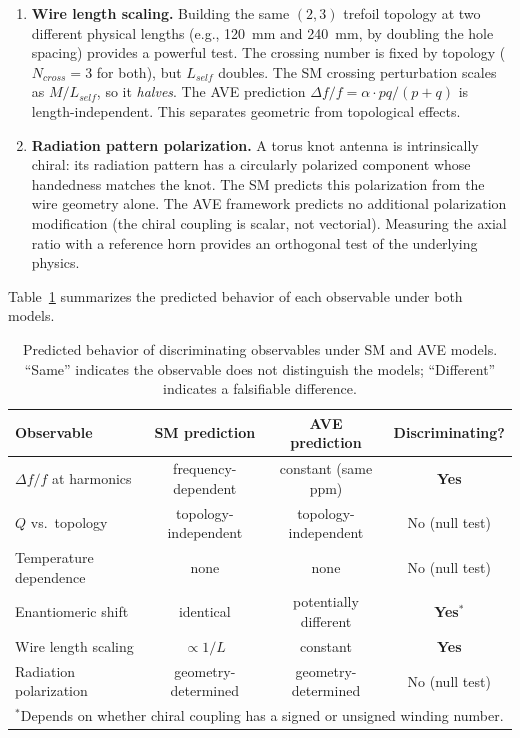 \begin{enumerate}
    \item \textbf{Wire length scaling.} Building the same $(2,3)$ trefoil topology at two different physical lengths (e.g., 120~mm and 240~mm, by doubling the hole spacing) provides a powerful test. The crossing number is fixed by topology ($N_{cross} = 3$ for both), but $L_{self}$ doubles. The SM crossing perturbation scales as $M/L_{self}$, so it \textit{halves}. The AVE prediction $\Delta f/f = \alpha \cdot pq/(p+q)$ is length-independent. This separates geometric from topological effects.

    \item \textbf{Radiation pattern polarization.} A torus knot antenna is intrinsically chiral: its radiation pattern has a circularly polarized component whose handedness matches the knot. The SM predicts this polarization from the wire geometry alone. The AVE framework predicts no additional polarization modification (the chiral coupling is scalar, not vectorial). Measuring the axial ratio with a reference horn provides an orthogonal test of the underlying physics.
\end{enumerate}

Table~\ref{tab:discriminators} summarizes the predicted behavior of each observable under both models.

\begin{table}[ht]
\centering
\caption{Predicted behavior of discriminating observables under SM and AVE models. ``Same'' indicates the observable does not distinguish the models; ``Different'' indicates a falsifiable difference.}
\label{tab:discriminators}
\begin{tabular}{|l|c|c|c|}
\hline
Observable & SM prediction & AVE prediction & Discriminating? \\ \hline
$\Delta f/f$ at harmonics     & frequency-dependent         & constant (same ppm)         & \textbf{Yes} \\
$Q$ vs.\ topology              & topology-independent        & topology-independent        & No (null test)  \\
Temperature dependence         & none                        & none                        & No (null test)  \\
Enantiomeric shift             & identical                   & potentially different       & \textbf{Yes}$^*$ \\
Wire length scaling            & $\propto 1/L$               & constant                    & \textbf{Yes} \\
Radiation polarization         & geometry-determined         & geometry-determined          & No (null test)  \\ \hline
\multicolumn{4}{l}{\footnotesize $^*$Depends on whether chiral coupling has a signed or unsigned winding number.}
\end{tabular}
\end{table}

